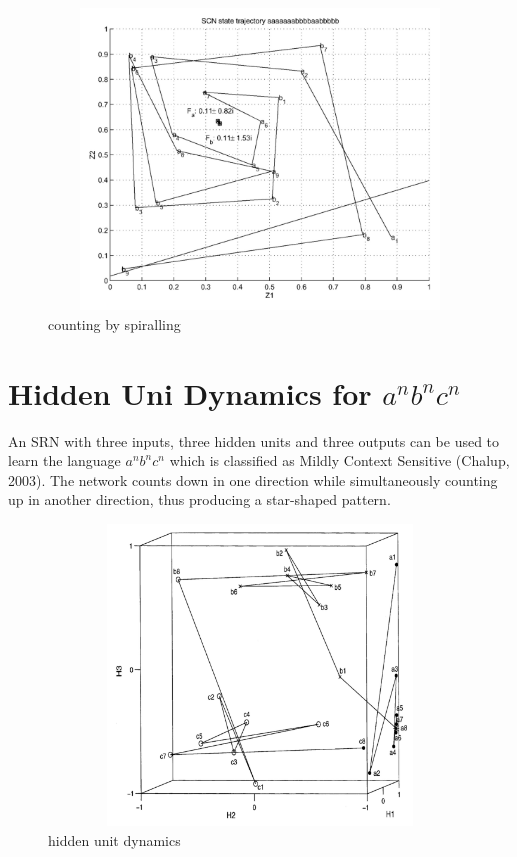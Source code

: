 \documentclass[11pt]{article}
\begin{document}
\begin{figure}[Hh]
    \centering
    \includegraphics[width=12cm, height=8cm]{../out/images/counting-by-spiralling}
    \caption[counting by spiralling]{counting by spiralling}
    \label{fig: counting by spiralling}
\end{figure}

\section{Hidden Uni Dynamics for $a^n b^n c^n$}\label{sec:hidden-uni-dynamics-for-$a^n-b^n-c^n$}

An SRN with three inputs, three hidden units and three outputs can be used to learn the language $a^n b^n c^n$ which is classified as Mildly Context Sensitive (Chalup, 2003).
The network counts down in one direction while simultaneously counting up in another direction, thus producing a star-shaped pattern.

\begin{figure}[h]
    \centering
    \includegraphics[width=12cm, height=8cm]{../out/images/hidden-unit-dynamics}
    \caption[hidden unit dynamics]{hidden unit dynamics}
    \label{fig: hidden unit dynamics}
\end{figure}
\end{document}
